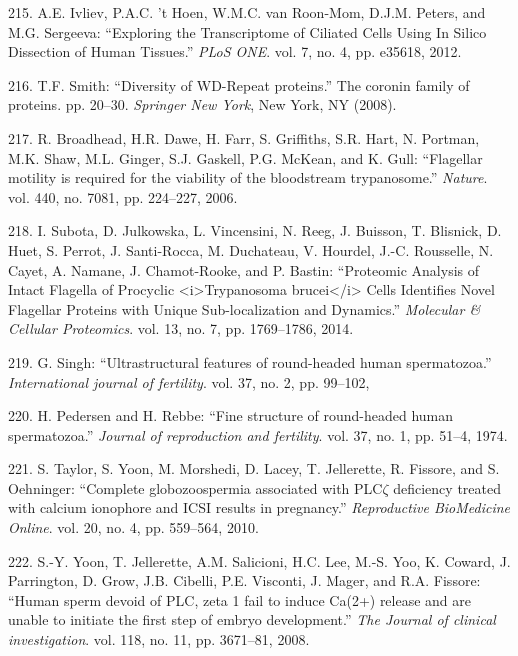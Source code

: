 \documentclass[12pt,a4paper,twoside]{ugathesis}
\theoremstyle{definition}
\theoremstyle{definition}
\theoremstyle{definition}
\theoremstyle{remark}
\begin{document}
\hypertarget{ref-Ivliev2012}{}
215. A.E. Ivliev, P.A.C. 't Hoen, W.M.C. van Roon-Mom, D.J.M. Peters,
and M.G. Sergeeva: ``Exploring the Transcriptome of Ciliated Cells Using
In Silico Dissection of Human Tissues.'' \emph{PLoS ONE}. vol. 7, no. 4,
pp. e35618, 2012.

\hypertarget{ref-Smith2008}{}
216. T.F. Smith: ``Diversity of WD-Repeat proteins.'' The coronin family
of proteins. pp. 20--30. \emph{Springer New York}, New York, NY (2008).

\hypertarget{ref-Broadhead2006}{}
217. R. Broadhead, H.R. Dawe, H. Farr, S. Griffiths, S.R. Hart, N.
Portman, M.K. Shaw, M.L. Ginger, S.J. Gaskell, P.G. McKean, and K. Gull:
``Flagellar motility is required for the viability of the bloodstream
trypanosome.'' \emph{Nature}. vol. 440, no. 7081, pp. 224--227, 2006.

\hypertarget{ref-Subota2014}{}
218. I. Subota, D. Julkowska, L. Vincensini, N. Reeg, J. Buisson, T.
Blisnick, D. Huet, S. Perrot, J. Santi-Rocca, M. Duchateau, V. Hourdel,
J.-C. Rousselle, N. Cayet, A. Namane, J. Chamot-Rooke, and P. Bastin:
``Proteomic Analysis of Intact Flagella of Procyclic
\textless{}i\textgreater{}Trypanosoma brucei\textless{}/i\textgreater{}
Cells Identifies Novel Flagellar Proteins with Unique Sub-localization
and Dynamics.'' \emph{Molecular \& Cellular Proteomics}. vol. 13, no. 7,
pp. 1769--1786, 2014.

\hypertarget{ref-Singh}{}
219. G. Singh: ``Ultrastructural features of round-headed human
spermatozoa.'' \emph{International journal of fertility}. vol. 37, no.
2, pp. 99--102,

\hypertarget{ref-Pedersen1974}{}
220. H. Pedersen and H. Rebbe: ``Fine structure of round-headed human
spermatozoa.'' \emph{Journal of reproduction and fertility}. vol. 37,
no. 1, pp. 51--4, 1974.

\hypertarget{ref-Taylor2010}{}
221. S. Taylor, S. Yoon, M. Morshedi, D. Lacey, T. Jellerette, R.
Fissore, and S. Oehninger: ``Complete globozoospermia associated with
PLC\(\zeta\) deficiency treated with calcium ionophore and ICSI results
in pregnancy.'' \emph{Reproductive BioMedicine Online}. vol. 20, no. 4,
pp. 559--564, 2010.

\hypertarget{ref-Yoon2008}{}
222. S.-Y. Yoon, T. Jellerette, A.M. Salicioni, H.C. Lee, M.-S. Yoo, K.
Coward, J. Parrington, D. Grow, J.B. Cibelli, P.E. Visconti, J. Mager,
and R.A. Fissore: ``Human sperm devoid of PLC, zeta 1 fail to induce
Ca(2+) release and are unable to initiate the first step of embryo
development.'' \emph{The Journal of clinical investigation}. vol. 118,
no. 11, pp. 3671--81, 2008.
\end{document}
